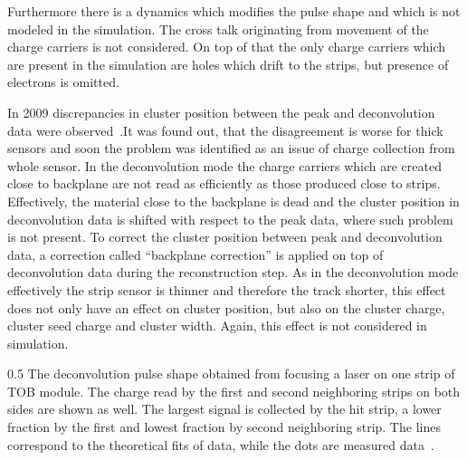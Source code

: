 Furthermore there is a dynamics which modifies the pulse shape and which is not modeled in the simulation. The cross talk originating from movement of the charge carriers is not considered. On top of that the only charge carriers which are present in the simulation are holes which drift to the strips, but presence of electrons is omitted.

In 2009 discrepancies in cluster position between the peak and deconvolution data were observed~\cite{website:backplane}.It was found out, that the disagreement is worse for thick sensors and soon the problem was identified as an issue of charge collection from whole sensor. In the deconvolution mode the charge carriers which are created close to backplane are not read as efficiently as those produced close to strips. Effectively, the material close to the backplane is dead and the cluster position in deconvolution data is shifted with respect to the peak data, where such problem is not present. To correct the cluster position between peak and deconvolution data, a correction called ``backplane correction'' is applied on top of deconvolution data during the reconstruction step. As in the deconvolution mode effectively the strip sensor is thinner and therefore the track shorter, this effect does not only have an effect on cluster position, but also on the cluster charge, cluster seed charge and cluster width. Again, this effect is not considered in simulation.


                 {0.5}       %
                 { The deconvolution pulse shape obtained from focusing a laser on one strip of TOB module. The charge read by the first and second neighboring strips on both sides are shown as well. The largest signal is collected by the hit strip, a lower fraction by the first and lowest fraction by second neighboring strip. The lines correspond to the theoretical fits of data, while the dots are measured data~\cite{Delaere:1061284}.  }


